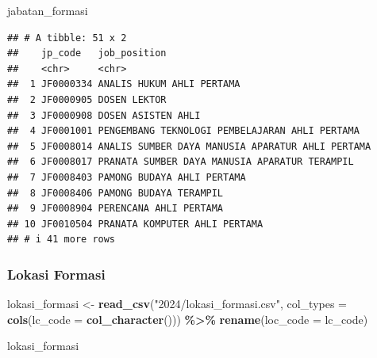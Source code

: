 \documentclass[
]{article}
\newenvironment{Shaded}{\begin{snugshade}}{\end{snugshade}}
\newcommand{\AttributeTok}[1]{\textcolor[rgb]{0.13,0.29,0.53}{#1}}
\newcommand{\FunctionTok}[1]{\textcolor[rgb]{0.13,0.29,0.53}{\textbf{#1}}}
\newcommand{\NormalTok}[1]{#1}
\newcommand{\OtherTok}[1]{\textcolor[rgb]{0.56,0.35,0.01}{#1}}
\newcommand{\SpecialCharTok}[1]{\textcolor[rgb]{0.81,0.36,0.00}{\textbf{#1}}}
\newcommand{\StringTok}[1]{\textcolor[rgb]{0.31,0.60,0.02}{#1}}
\begin{document}
\begin{Shaded}
\begin{Highlighting}[]
\NormalTok{jabatan\_formasi}
\end{Highlighting}
\end{Shaded}

\begin{verbatim}
## # A tibble: 51 x 2
##    jp_code   job_position                                    
##    <chr>     <chr>                                           
##  1 JF0000334 ANALIS HUKUM AHLI PERTAMA                       
##  2 JF0000905 DOSEN LEKTOR                                    
##  3 JF0000908 DOSEN ASISTEN AHLI                              
##  4 JF0001001 PENGEMBANG TEKNOLOGI PEMBELAJARAN AHLI PERTAMA  
##  5 JF0008014 ANALIS SUMBER DAYA MANUSIA APARATUR AHLI PERTAMA
##  6 JF0008017 PRANATA SUMBER DAYA MANUSIA APARATUR TERAMPIL   
##  7 JF0008403 PAMONG BUDAYA AHLI PERTAMA                      
##  8 JF0008406 PAMONG BUDAYA TERAMPIL                          
##  9 JF0008904 PERENCANA AHLI PERTAMA                          
## 10 JF0010504 PRANATA KOMPUTER AHLI PERTAMA                   
## # i 41 more rows
\end{verbatim}

\subsubsection{Lokasi Formasi}\label{lokasi-formasi}

\begin{Shaded}
\begin{Highlighting}[]
\NormalTok{lokasi\_formasi }\OtherTok{\textless{}{-}} \FunctionTok{read\_csv}\NormalTok{(}\StringTok{"2024/lokasi\_formasi.csv"}\NormalTok{,}
                           \AttributeTok{col\_types =} \FunctionTok{cols}\NormalTok{(}\AttributeTok{lc\_code =} \FunctionTok{col\_character}\NormalTok{())) }\SpecialCharTok{\%\textgreater{}\%} 
  \FunctionTok{rename}\NormalTok{(}\AttributeTok{loc\_code =}\NormalTok{ lc\_code)}

\NormalTok{lokasi\_formasi}
\end{Highlighting}
\end{Shaded}
\end{document}
